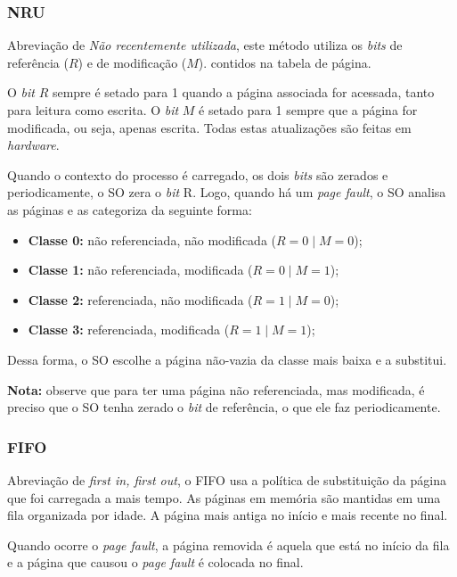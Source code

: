 \subsubsection{NRU}
Abreviação de \textit{Não recentemente utilizada}, este método utiliza os \textit{bits} de referência ($R$) e de modificação ($M$). contidos na tabela de página.

O \textit{bit} $R$ sempre é setado para 1 quando a página associada for acessada, tanto para leitura como escrita. O \textit{bit} $M$ é setado para 1 sempre que a página for modificada, ou seja, apenas escrita. Todas estas atualizações são feitas em \textit{hardware}.

Quando o contexto do processo é carregado, os dois \textit{bits} são zerados e periodicamente, o SO zera o \textit{bit} R. Logo, quando há um \textit{page fault}, o SO analisa as páginas e as categoriza da seguinte forma:

\begin{itemize}
  \item \textbf{Classe 0:} não referenciada, não modificada ($R = 0 \mid M = 0$);

  \item \textbf{Classe 1:} não referenciada, modificada ($R = 0 \mid M = 1$);

  \item \textbf{Classe 2:} referenciada, não modificada ($R = 1 \mid M = 0$);

  \item \textbf{Classe 3:} referenciada, modificada ($R = 1 \mid M = 1$);
\end{itemize}

Dessa forma, o SO escolhe a página não-vazia da classe mais baixa e a substitui.

\textbf{Nota:} observe que para ter uma página não referenciada, mas modificada, é preciso que o SO tenha zerado o \textit{bit} de referência, o que ele faz periodicamente.



\subsubsection{FIFO}
Abreviação de \textit{first in, first out}, o FIFO usa a política de substituição da página que foi carregada a mais tempo. As páginas em memória são mantidas em uma fila organizada por idade. A página mais antiga no início e mais recente no final.

Quando ocorre o \textit{page fault}, a página removida é aquela que está no início da fila e a página que causou o \textit{page fault} é colocada no final.

